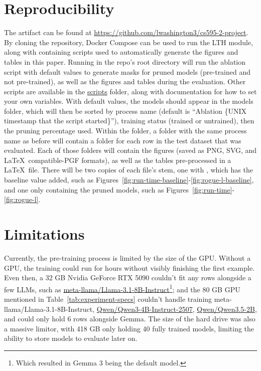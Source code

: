 \documentclass[
	title={Lottery Ticket Hypothesis for Large Language Models}
]{cs595project}
\newcommand{\hfmodel}[1]{\href{https://huggingface.co/#1}{#1}}
\begin{document}
\section{Reproducibility}\label{sec:reproducibility}
The artifact can be found at \url{https://github.com/lwashington3/cs595-2-project}.
By cloning the repository, Docker Compose can be used to run the LTH module, along with containing scripts used to automatically generate the figures and tables in this paper.
Running  in the repo's root directory will run the ablation script with default values to generate masks for pruned models (pre-trained and not pre-trained), as well as the figures and tables during the evaluation.
Other scripts are available in the \href{https://github.com/lwashington3/cs595-2-project/tree/main/scripts}{scripts} folder, along with documentation for how to set your own variables.
With default values, the models should appear in the models folder, which will then be sorted by process name (default is ``Ablation \{UNIX timestamp that the script started\}''), training status (trained or untrained), then the pruning percentage used.
Within the  folder, a folder with the same process name as before will contain a folder for each row in the test dataset that was evaluated.
Each of those folders will contain the figures (saved as PNG, SVG, and \LaTeX\ compatible-PGF formats), as well as the tables pre-processed in a \LaTeX\ file.
There will be two copies of each file's stem, one with , which has the baseline value added, such as Figures~\ref{fig:run-time-baseline}-\ref{fig:rogue-l-baseline}, and one only containing the pruned models, such as Figures~\ref{fig:run-time}-\ref{fig:rogue-l}.

\section{Limitations}\label{sec:limitations}
Currently, the pre-training process is limited by the size of the GPU.
Without a GPU, the training could run for hours without visibly finishing the first example.
Even then, a 32 GB Nvidia GeForce RTX 5090 couldn't fit any rows alongside a few LLMs, such as \hfmodel{meta-llama/Llama-3.1-8B-Instruct}\footnote{Which resulted in Gemma 3 being the default model.};
and the 80 GB GPU mentioned in Table~\ref{tab:experiment-specs} couldn't handle training meta-llama/Llama-3.1-8B-Instruct, \hfmodel{Qwen/Qwen3-4B-Instruct-2507}, \hfmodel{Qwen/Qwen3.5-2B}, and could only hold 6 rows alongside Gemma.
The size of the hard drive was also a massive limitor, with 418 GB only holding 40 fully trained models, limiting the ability to store models to evaluate later on.
\end{document}
